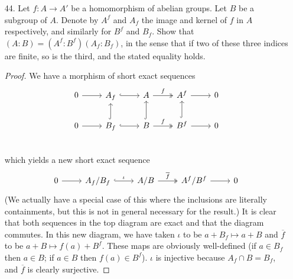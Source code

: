 \documentclass[10pt]{article}
\DeclareMathOperator*{\Alt}{Alt}
\renewcommand{\bar}{\overline}
\begin{document}
\begin{enumerate}
\begin{enumerate}
\item Show that there exists an automorphism of $A_n$ mapping $H_1$ on $H$, and that such an automorphism is induced by an inner automorphism of $S_n$ if and only if $H = H_i$ for some $i$.

\begin{proof}
We have just seen that the action of $A_n$ by left translation on $A_n / H$ gives an isomorphism of $A_n$ into $\Alt(A_n / H)$.  If $h \in H$, then translation by $h$ fixes the coset $H$.  So, labeling the coset $H$ as element $1$, the restriction of this isomorphism to $H$ yields an embedding of $H$ into $H_1$.  Since these two subgroups have equal size, this embedding is actually an isomorphism.

Now, let $i,j \in \{1, \dots , n\}$ and let $\sigma \in S_n$ be such that $\sigma(i) = j$.  Clearly, $\sigma H_i \sigma^{-1} \subseteq H_j$.  However, since $|\sigma H_i \sigma^{-1}| = |H_j|$, we actually have an isomorphism.  Now, suppose $\sigma H \sigma^{-1} = H_j$.  Then $H = \sigma^{-1}H_j \sigma$.  Since $\sigma^{-1}(j) = i$, we must have $H = H_i$.  Thus this automorphism is induced by an inner automorphism of $S_n$ if and only if $H = H_i$ for some $i$.
\end{proof}

\end{enumerate}

\item[44.] Let $f: A \rightarrow A'$ be a homomorphism of abelian groups.  Let $B$ be a subgroup of $A$.  Denote by $A^f$ and $A_f$ the image and kernel of $f$ in $A$ respectively, and similarly for $B^f$ and $B_f$.  Show that $(A:B) = (A^f : B^f)(A_f : B_f)$, in the sense that if two of these three indices are finite, so is the third, and the stated equality holds.

\begin{proof}
We have a morphism of short exact sequences
$$
\begin{tikzcd}
0 \arrow[r] & A_f \arrow[r, hook] & A \arrow[r, twoheadrightarrow, "f"] & A^f \arrow[r] & 0 \\
0 \arrow[r] & B_f \arrow[u, hook] \arrow[r, hook] & B \arrow[u, hook] \arrow[r, twoheadrightarrow, "f"] & B^f \arrow[u, hook] \arrow[r] & 0 \\
\end{tikzcd}
$$
which yields a new short exact sequence
$$
\begin{tikzcd}
0 \arrow[r] & A_f / B_f \arrow[r, hook, "\iota"] & A/B \arrow[r, twoheadrightarrow, "\bar{f}"] & A^f / B^f \arrow[r] & 0
\end{tikzcd}
$$
(We actually have a special case of this where the inclusions are literally containments, but this is not in general necessary for the result.)
It is clear that both sequences in the top diagram are exact and that the diagram commutes.  In this new diagram, we have taken $\iota$ to be $a+B_f \mapsto a+B$ and $\bar{f}$ to be $a+B \mapsto f(a)+B^f$.  These maps are obviously well-defined (if $a \in B_f$ then $a \in B$; if $a \in B$ then $f(a) \in B^f$).  $\iota$ is injective because $A_f \cap B = B_f$, and $\bar{f}$ is clearly surjective.



\end{proof}
\end{enumerate}
\end{document}
